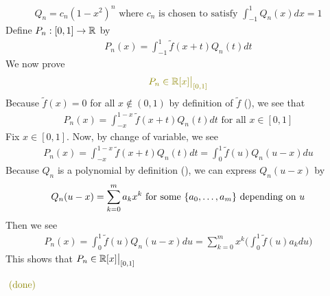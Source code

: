 \documentclass{report}
\begin{document}
\begin{proof*}
\begin{align}
\label{tse3}
Q_n=c_n(1-x^2)^n\text{ where $c_n$ is chosen to satisfy }\int_{-1}^1 Q_n(x)dx=1
\end{align}
Define $P_n:[0,1]\rightarrow \mathbb{R}$ by 
\begin{align*}
P_n(x)=\int_{-1}^1 \tilde{f} (x+t)Q_n(t)dt
\end{align*}
We now prove 
\begin{align*}
\olive{P_n \in \R[x]\big|_{[0,1]}}
\end{align*}
Because $\tilde{f}(x)=0$ for all $x \not \in (0,1)$ by definition of $\tilde{f} $ (), we see that 
\begin{align}
\label{tse4}
P_n(x)=\int_{-x}^{1-x}\tilde{f}(x+t)Q_n(t)dt \text{ for all }x \in [0,1]
\end{align}
Fix $x \in [0,1]$. Now, by change of variable, we see 
\begin{align*}
P_n(x)=\int_{-x}^{1-x} \tilde{f}(x+t)Q_n(t)dt=\int_{0}^1 \tilde{f}(u)Q_n(u-x)du  
\end{align*}
Because $Q_n$ is a polynomial by definition (), we can express $Q_n(u-x)$ by 
\begin{align*}
Q_n(u-x)=\sum_{k=0}^{m} a_k x^k\text{ for some $\{ a_0,\dots ,a_m \}$ depending on $u$}
\end{align*}
Then we see 
\begin{align*}
  P_n(x)=\int_0^1 \tilde{f}(u)Q_n(u-x)du= \sum_{k=0}^m x^k \Big( 
\int_0^1 \tilde{f}(u) a_kdu
  \Big)  
\end{align*}
This shows that $P_n \in\mathbb{R}[x]\big|_{[0,1]}$

$\odone$\\



\end{proof*}
\end{document}
